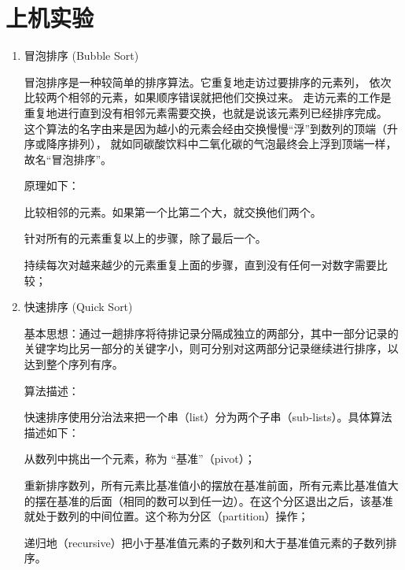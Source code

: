 \section{上机实验}
\begin{enumerate}
\item 冒泡排序 (Bubble Sort)

冒泡排序是一种较简单的排序算法。它重复地走访过要排序的元素列，
依次比较两个相邻的元素，如果顺序错误就把他们交换过来。
走访元素的工作是重复地进行直到没有相邻元素需要交换，也就是说该元素列已经排序完成。
这个算法的名字由来是因为越小的元素会经由交换慢慢“浮”到数列的顶端（升序或降序排列），
就如同碳酸饮料中二氧化碳的气泡最终会上浮到顶端一样，故名“冒泡排序”。

原理如下：

比较相邻的元素。如果第一个比第二个大，就交换他们两个。

针对所有的元素重复以上的步骤，除了最后一个。

持续每次对越来越少的元素重复上面的步骤，直到没有任何一对数字需要比较；

\item 快速排序 (Quick Sort)

基本思想：通过一趟排序将待排记录分隔成独立的两部分，其中一部分记录的关键字均比另一部分的关键字小，则可分别对这两部分记录继续进行排序，以达到整个序列有序。

算法描述：

    快速排序使用分治法来把一个串（list）分为两个子串（sub-lists）。具体算法描述如下：

    从数列中挑出一个元素，称为 “基准”（pivot）；

    重新排序数列，所有元素比基准值小的摆放在基准前面，所有元素比基准值大的摆在基准的后面（相同的数可以到任一边）。在这个分区退出之后，该基准就处于数列的中间位置。这个称为分区（partition）操作；

    递归地（recursive）把小于基准值元素的子数列和大于基准值元素的子数列排序。

\end{enumerate}

